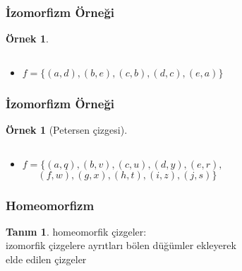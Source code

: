 \documentclass[dvipsnames]{beamer}
\theoremstyle{definition}
\newtheorem{tanim}[theorem]{Tanım}
\theoremstyle{example}
\newtheorem{ornek}[theorem]{Örnek}
\theoremstyle{plain}
\begin{document}
\begin{frame}
  \frametitle{İzomorfizm Örneği}

  \begin{ornek}
    \begin{columns}
      \begin{center}
      \end{center}

      \begin{center}
      \end{center}
    \end{columns}

    \pause
    \bigskip
    \begin{itemize}
      \item $f = \{(a,d),(b,e),(c,b),(d,c),(e,a)\}$
    \end{itemize}
  \end{ornek}
\end{frame}

\begin{frame}
  \frametitle{İzomorfizm Örneği}

  \begin{ornek}[Petersen çizgesi]
    \begin{columns}
      \begin{center}
      \end{center}

      \begin{center}
      \end{center}
    \end{columns}

    \pause
    \bigskip
    \begin{itemize}
      \item $f = \{(a,q),(b,v),(c,u),(d,y),(e,r),$\\
        $~~~~~~~(f,w),(g,x),(h,t),(i,z),(j,s)\}$
    \end{itemize}
  \end{ornek}
\end{frame}

\begin{frame}
  \frametitle{Homeomorfizm}

  \begin{tanim}
    \alert{homeomorfik çizgeler}:\\
    izomorfik çizgelere ayrıtları bölen düğümler ekleyerek\\
    elde edilen çizgeler
  \end{tanim}
\end{frame}
\end{document}
